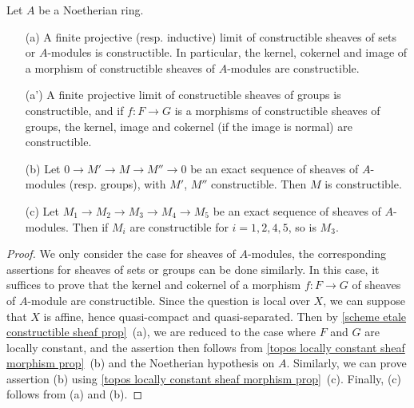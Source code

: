 \begin{proposition}\label{scheme etale constructible sheaf category prop}
Let $A$ be a Noetherian ring.
\begin{enumerate}
    \item[(a)] A finite projective (resp. inductive) limit of constructible sheaves of sets or $A$-modules is constructible. In particular, the kernel, cokernel and image of a morphism of constructible sheaves of $A$-modules are constructible.
    \item[(a')] A finite projective limit of constructible sheaves of groups is constructible, and if $f:F\to G$ is a morphisms of constructible sheaves of groups, the kernel, image and cokernel (if the image is normal) are constructible.
    \item[(b)] Let $0\to M'\to M\to M''\to 0$ be an exact sequence of sheaves of $A$-modules (resp. groups), with $M'$, $M''$ constructible. Then $M$ is constructible.
    \item[(c)] Let $M_1\to M_2\to M_3\to M_4\to M_5$ be an exact sequence of sheaves of $A$-modules. Then if $M_i$ are constructible for $i=1,2,4,5$, so is $M_3$.
\end{enumerate}
\end{proposition}
\begin{proof}
We only consider the case for sheaves of $A$-modules, the corresponding assertions for sheaves of sets or groups can be done similarly. In this case, it suffices to prove that the kernel and cokernel of a morphism $f:F\to G$ of sheaves of $A$-module are constructible. Since the question is local over $X$, we can suppose that $X$ is affine, hence quasi-compact and quasi-separated. Then by \cref{scheme etale constructible sheaf prop}~(a), we are reduced to the case where $F$ and $G$ are locally constant, and the assertion then follows from \cref{topos locally constant sheaf morphism prop}~(b) and the Noetherian hypothesis on $A$. Similarly, we can prove assertion (b) using \cref{topos locally constant sheaf morphism prop}~(c). Finally, (c) follows from (a) and (b).
\end{proof}

